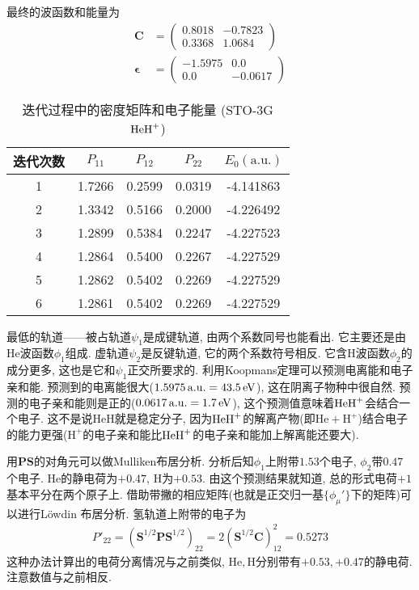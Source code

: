最终的波函数和能量为
\begin{align}
	\mathbf{C} &= 
	\begin{pmatrix}
		0.8018&-0.7823\\0.3368&1.0684
	\end{pmatrix}\\
	\bm{\epsilon} &= 
	\begin{pmatrix}
		-1.5975&0.0\\0.0&-0.0617
	\end{pmatrix}
\end{align}
\begin{table}[H]
	\centering
	\caption{迭代过程中的密度矩阵和电子能量 (STO-3G $\mathrm{HeH}^+$) }
	\begin{tabular}{ccccc}
		\hline
		迭代次数 & $P_{11}$ & $P_{12}$ & $P_{22}$ & $E_0(\mathrm{a.u.})$ \\ \hline
		1   &  1.7266  &  0.2599  &  0.0319  &      -4.141863       \\
		2   &  1.3342  &  0.5166  &  0.2000  &      -4.226492       \\
		3   &  1.2899  &  0.5384  &  0.2247  &      -4.227523       \\
		4   &  1.2864  &  0.5400  &  0.2267  &      -4.227529       \\
		5   &  1.2862  &  0.5402  &  0.2269  &      -4.227529       \\
		6   &  1.2861  &  0.5402  &  0.2269  &      -4.227529       \\ \hline
	\end{tabular}
	\label{t3.5}
\end{table}
最低的轨道——被占轨道$\psi_1$是成键轨道, 
由两个系数同号也能看出. 
它主要还是由$\mathrm{He}$波函数$\phi_1$组成. 
虚轨道$\psi_2$是反键轨道, 
它的两个系数符号相反. 
它含$\mathrm{H}$波函数$\phi_2$的成分更多, 
这也是它和$\psi_1$正交所要求的. 
利用Koopmans定理可以预测电离能和电子亲和能. 
预测到的电离能很大($1.5975\,\mathrm{a.u.}=43.5 \,\mathrm{eV}$), 
这在阴离子物种中很自然. 
预测的电子亲和能则是正的($0.0617\,\mathrm{a.u.}=1.7\,\mathrm{eV}$), 
这个预测值意味着$\mathrm{HeH}^+$会结合一个电子. 
这不是说$\mathrm{HeH}$就是稳定分子, 
因为$\mathrm{HeH}^+$的解离产物(即$\mathrm{He}+\mathrm{H}^+$)结合电子的能力更强($\mathrm{H}^+$的电子亲和能比$\mathrm{HeH}^+$的电子亲和能加上解离能还要大).


用$\mathbf{PS}$的对角元可以做Mulliken布居分析. 
分析后知$\phi_1$上附带$1.53$个电子, 
$\phi_2$带$0.47$个电子.
$\mathrm{He}$的静电荷为$+0.47$, 
$\mathrm{H}$为$+0.53$. 
由这个预测结果就知道, 
总的形式电荷$+1$基本平分在两个原子上. 
借助带撇的相应矩阵(也就是正交归一基$\{\phi_\mu'\}$下的矩阵)可以进行L\"owdin 布居分析. 
氢轨道上附带的电子为
\begin{align}
	P'_{22} = (\mathbf{S}^{1/2}\mathbf{PS}^{1/2})_{22} = 2(\mathbf{S}^{1/2}\mathbf{C})^2_{12}=0.5273
\end{align}
这种办法计算出的电荷分离情况与之前类似, 
$\mathrm{He,H}$分别带有$+0.53,+0.47$的静电荷. 
注意数值与之前相反.


